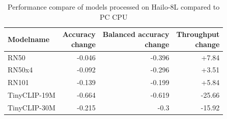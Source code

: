 \begin{table}[h!]
    \centering
    \begin{tabular}{l|rrr}
    \hline
    Modelname & \makecell{Accuracy\\change} &  \makecell{Balanced accuracy\\change}&\makecell{Throughput\\change}
    \\
    \hline
    RN50 & -0.046 & -0.396 &  +7.84\\
    RN50x4 & -0.092 & -0.296 &  +3.51\\
    RN101 & -0.139&  -0.199& +5.84\\  
    TinyCLIP-19M &-0.664 & -0.619 & -25.66\\ 
    TinyCLIP-30M &-0.215 & -0.3 & -15.92\\ 
    \end{tabular}
    \caption{Performance compare of models processed on Hailo-8L compared to PC CPU}
    \label{methods:tab:comparehailopc}
\end{table}

